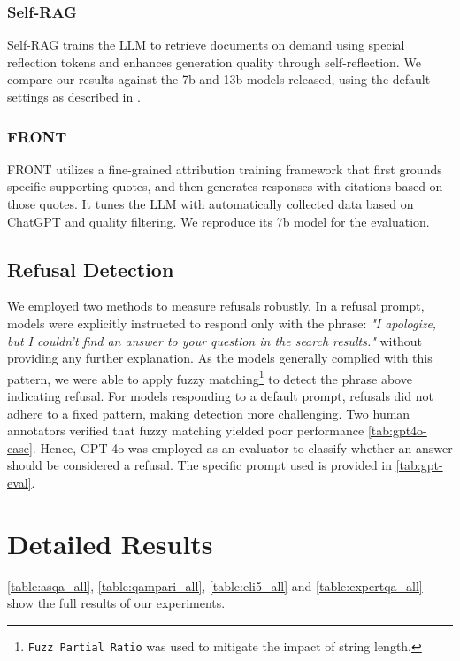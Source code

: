 \documentclass{article} %
\renewcommand{\cite}[1]{\citep{#1}}
\begin{document}
\subsubsection{Self-RAG}
Self-RAG trains the LLM to retrieve documents on demand using special reflection tokens and enhances generation quality through self-reflection. We compare our results against the 7b and 13b models released, using the default settings as described in \cite{asai2024selfrag}.

\subsubsection{FRONT}
FRONT \cite{huang-etal-2024-learning} utilizes a fine-grained attribution training framework that first grounds specific supporting quotes, and then generates responses with citations based on those quotes. It tunes the LLM with automatically collected data based on ChatGPT and quality filtering. We reproduce its 7b model for the evaluation.

\subsection{Refusal Detection}
We employed two methods to measure refusals robustly. In a refusal prompt, models were explicitly instructed to respond only with the phrase: \textit{"I apologize, but I couldn't find an answer to your question in the search results."} without providing any further explanation. As the models generally complied with this pattern, we were able to apply fuzzy matching\footnote{\texttt{Fuzz Partial Ratio} was used to mitigate the impact of string length.} to detect the phrase above indicating refusal. For models responding to a default prompt, refusals did not adhere to a fixed pattern, making detection more challenging. Two human annotators verified that fuzzy matching yielded poor performance \cref{tab:gpt4o-case}. Hence, GPT-4o was employed as an evaluator to classify whether an answer should be considered a refusal. The specific prompt used is provided in \cref{tab:gpt-eval}.


\section{Detailed Results} \label{app:detailed-results}
\cref{table:asqa_all}, \cref{table:qampari_all}, \cref{table:eli5_all} and \cref{table:expertqa_all} show the full results of our experiments.
\end{document}
